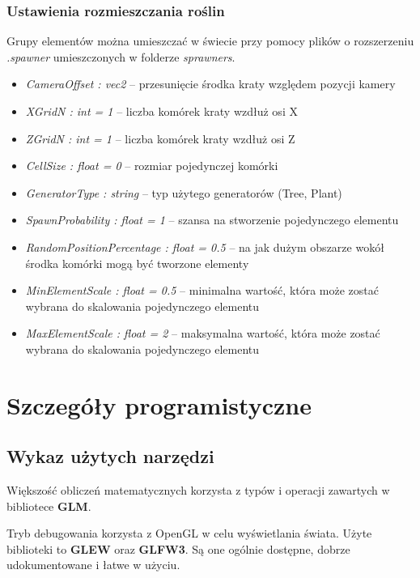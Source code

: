 \documentclass[inz,longabstract]{iithesis}
\begin{document}
        \subsection{Ustawienia rozmieszczania roślin}
        Grupy elementów można umieszczać w świecie przy pomocy plików o rozszerzeniu
        \textit{.spawner} umieszczonych w folderze \textit{sprawners}.
        \begin{itemize}
            \item \textit{CameraOffset : vec2} -- przesunięcie środka kraty względem pozycji kamery
            \item \textit{XGridN : int = 1} -- liczba komórek kraty wzdłuż osi X
            \item \textit{ZGridN : int = 1} -- liczba komórek kraty wzdłuż osi Z
            \item \textit{CellSize : float = 0} -- rozmiar pojedynczej komórki
            \item \textit{GeneratorType : string} -- typ użytego generatorów (Tree, Plant)
            \item \textit{SpawnProbability : float = 1} -- szansa na stworzenie pojedynczego elementu 
            \item \textit{RandomPositionPercentage : float = 0.5} -- na jak dużym obszarze wokół środka komórki mogą być tworzone elementy
            \item \textit{MinElementScale : float = 0.5} -- minimalna wartość, która może zostać wybrana do skalowania pojedynczego elementu
            \item \textit{MaxElementScale : float = 2} -- maksymalna wartość, która może zostać wybrana do skalowania pojedynczego elementu
        \end{itemize}
    
        
\chapter{Szczegóły programistyczne}
    \section{Wykaz użytych narzędzi}
        Większość obliczeń matematycznych korzysta z typów i operacji zawartych w bibliotece \textbf{GLM}.
        
        Tryb debugowania korzysta z OpenGL w celu wyświetlania świata. Użyte biblioteki to \textbf{GLEW} oraz \textbf{GLFW3}. Są one ogólnie dostępne, dobrze udokumentowane i łatwe w użyciu. 
        
\end{document}
